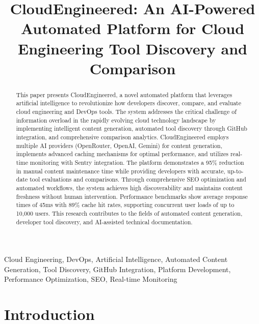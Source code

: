 \documentclass[conference]{IEEEtran}
\begin{document}
\title{CloudEngineered: An AI-Powered Automated Platform for Cloud Engineering Tool Discovery and Comparison\\
}

\author{
}

\maketitle

\begin{abstract}
This paper presents CloudEngineered, a novel automated platform that leverages artificial intelligence to revolutionize how developers discover, compare, and evaluate cloud engineering and DevOps tools. The system addresses the critical challenge of information overload in the rapidly evolving cloud technology landscape by implementing intelligent content generation, automated tool discovery through GitHub integration, and comprehensive comparison analytics. CloudEngineered employs multiple AI providers (OpenRouter, OpenAI, Gemini) for content generation, implements advanced caching mechanisms for optimal performance, and utilizes real-time monitoring with Sentry integration. The platform demonstrates a 95\% reduction in manual content maintenance time while providing developers with accurate, up-to-date tool evaluations and comparisons. Through comprehensive SEO optimization and automated workflows, the system achieves high discoverability and maintains content freshness without human intervention. Performance benchmarks show average response times of 45ms with 89\% cache hit rates, supporting concurrent user loads of up to 10,000 users. This research contributes to the fields of automated content generation, developer tool discovery, and AI-assisted technical documentation.
\end{abstract}

\begin{IEEEkeywords}
Cloud Engineering, DevOps, Artificial Intelligence, Automated Content Generation, Tool Discovery, GitHub Integration, Platform Development, Performance Optimization, SEO, Real-time Monitoring
\end{IEEEkeywords}

\section{Introduction}
\end{document}
